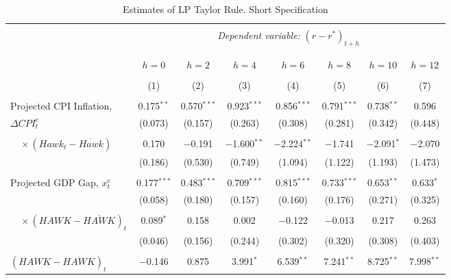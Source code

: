 \documentclass[11pt]{article}
\begin{document}
\begin{table}[!htbp] \centering \scriptsize
    \begin{threeparttable}
    \caption{Estimates of LP Taylor Rule. Short Specification} 
    \label{tab:LP_short_full} 
    \begin{tabular}{@{\extracolsep{3pt}}lccccccc} 
      \\[-1.8ex]\hline 
      \hline \\[-1.8ex] 
       & \multicolumn{7}{c}{\textit{Dependent variable:} $\left(r-r^*\right)_{t+h}$} \\ 
       \\[-1.8ex] 
      \cline{2-8} 
      \\[-1.8ex] & $h=0$ & $h=2$ & $h=4$ & $h=6$ & $h=8$ & $h=10$ & $h=12$ \\ 
      \\[-1.8ex] & (1) & (2) & (3) & (4) & (5) & (6) & (7)\\ 
      \hline \\[-1.8ex] 
       Projected CPI Inflation, & 0.175$^{**}$ & 0.570$^{***}$ & 0.923$^{***}$ & 0.856$^{***}$ & 0.791$^{***}$ & 0.738$^{**}$ & 0.596 \\ 
       $\Delta\mathit{CPI}_t^e$& (0.073) & (0.157) & (0.263) & (0.308) & (0.281) & (0.342) & (0.448) \\ 
        & & & & & & & \\ 
        $\quad \times \left(\mathit{Hawk}_t-\overline{\mathit{Hawk}}\right)$ & 0.170 & $-$0.191 & $-$1.600$^{**}$ & $-$2.224$^{**}$ & $-$1.741 & $-$2.091$^{*}$ & $-$2.070 \\ 
        & (0.186) & (0.530) & (0.749) & (1.094) & (1.122) & (1.193) & (1.473) \\ 
        & & & & & & & \\ 
        Projected GDP Gap, $x_{t}^e$ & 0.177$^{***}$ & 0.483$^{***}$ & 0.709$^{***}$ & 0.815$^{***}$ & 0.733$^{***}$ & 0.653$^{**}$ & 0.633$^{*}$ \\ 
       & (0.058) & (0.180) & (0.157) & (0.160) & (0.176) & (0.271) & (0.325) \\ 
        & & & & & & & \\ 
       $\quad \times \left(\mathit{HAWK}-\overline{\mathit{HAWK}}\right)_t$ & 0.089$^{*}$ & 0.158 & 0.002 & $-$0.122 & $-$0.013 & 0.217 & 0.263 \\ 
       & (0.046) & (0.156) & (0.244) & (0.302) & (0.320) & (0.308) & (0.403) \\ 
       & & & & & & & \\ 
    $\left(\mathit{HAWK}-\overline{\mathit{HAWK}}\right)_t$ & $-$0.146 & 0.875 & 3.991$^{*}$ & 6.539$^{**}$ & 7.241$^{**}$ & 8.725$^{**}$ & 7.998$^{**}$ \\ 

\end{tabular}
\end{threeparttable}
\end{table}
\end{document}
